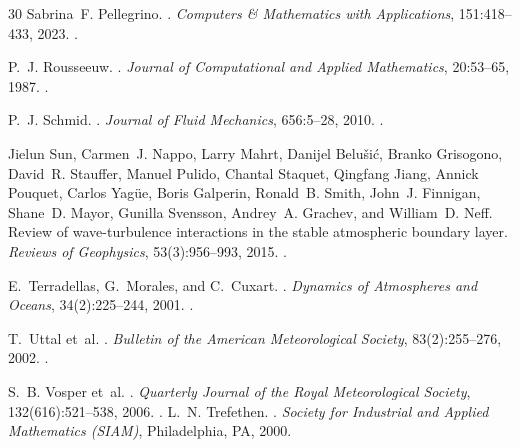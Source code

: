 \documentclass[11pt,a4paper]{article}
\begin{document}
\begin{thebibliography}{30}
Sabrina~F. Pellegrino.
.
\newblock \emph{Computers \& Mathematics with Applications}, 151:418--433, 2023.
\newblock {}.

P.~J. Rousseeuw.
.
\newblock \emph{Journal of Computational and Applied Mathematics}, 20:53--65, 1987.
\newblock {}.

P.~J. Schmid.
.
\newblock \emph{Journal of Fluid Mechanics}, 656:5--28, 2010.
\newblock {}.

Jielun Sun, Carmen~J. Nappo, Larry Mahrt, Danijel Belu\v{s}i\'{c}, Branko Grisogono, David~R. Stauffer, Manuel Pulido, Chantal Staquet, Qingfang Jiang, Annick Pouquet, Carlos Yag\"{u}e, Boris Galperin, Ronald~B. Smith, John~J. Finnigan, Shane~D. Mayor, Gunilla Svensson, Andrey~A. Grachev, and William~D. Neff.
\newblock Review of wave-turbulence interactions in the stable atmospheric boundary layer.
\newblock \emph{Reviews of Geophysics}, 53(3):956--993, 2015.
\newblock {}.

E.~Terradellas, G.~Morales, and C.~Cuxart.
.
\newblock \emph{Dynamics of Atmospheres and Oceans}, 34(2):225--244, 2001.
\newblock {}.

T.~Uttal et~al.
.
\newblock \emph{Bulletin of the American Meteorological Society}, 83(2):255--276, 2002.
\newblock {}.

S.~B. Vosper et~al.
.
\newblock \emph{Quarterly Journal of the Royal Meteorological Society}, 132(616):521--538, 2006.
\newblock {}.
L.~N. Trefethen.
.
\newblock \emph{Society for Industrial and Applied Mathematics (SIAM)},
  Philadelphia, PA, 2000.


\end{thebibliography}
\end{document}
